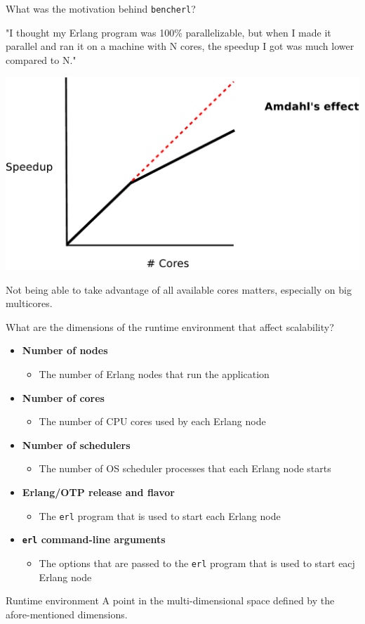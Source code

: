 \documentclass{beamer}
\begin{document}
\begin{frame}{What was the motivation behind \texttt{bencherl}?}
	\begin{block}{}
	"I thought my Erlang program was 100\% parallelizable, but when I made it parallel and ran it on a machine with N cores, the speedup I got was much lower compared to N."
	\end{block}
	\begin{center}
	    \includegraphics[width=0.5\linewidth]{figures/amdahls.pdf}
	\end{center}
	Not being able to take advantage of all available cores matters, especially on big multicores.
\end{frame}

\begin{frame}{What are the dimensions of the runtime environment that affect scalability?}
	\begin{itemize}
		\item {\bf Number of nodes}
		\begin{itemize}\item The number of Erlang nodes that run the application\end{itemize}
		\item {\bf Number of cores}
        \begin{itemize}\item The number of CPU cores used by each Erlang node\end{itemize}
 		\item {\bf Number of schedulers}
        \begin{itemize}\item The number of OS scheduler processes that each Erlang node starts\end{itemize}
 		\item {\bf Erlang/OTP release and flavor}
        \begin{itemize}\item The \texttt{erl} program that is used to start each Erlang node\end{itemize}
 		\item {\bf \texttt{erl} command-line arguments}
        \begin{itemize}\item The options that are passed to the \texttt{erl} program that is used to start eacj Erlang node\end{itemize}
 	\end{itemize}
	\begin{block}{Runtime environment}
		A point in the multi-dimensional space defined by the afore-mentioned dimensions.
	\end{block}
\end{frame}
\end{document}
